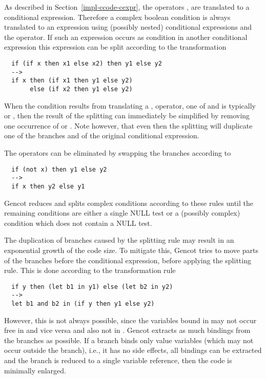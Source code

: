 As described in Section~\ref{impl-ccode-cexpr}, the operators \code{\&\&}, \code{||} are translated to a conditional expression. Therefore
a complex boolean condition is always translated to an expression using (possibly nested) conditional expressions and the  operator.
If such an expression occurs as condition in another conditional expression this expression can be split according to the transformation
\begin{verbatim}
  if (if x then x1 else x2) then y1 else y2
  -->
  if x then (if x1 then y1 else y2)
       else (if x2 then y1 else y2)
\end{verbatim}
When the condition results from translating a \code{\&\&}, \code{||} operator, one of  and  is typically 
or , then the result of the splitting can immediately be simplified by removing one occurrence of  or .
Note however, that even then the splitting will duplicate one of the branches  and  of the original conditional expression.

The  operators can be eliminated by swapping the branches according to
\begin{verbatim}
  if (not x) then y1 else y2
  -->
  if x then y2 else y1
\end{verbatim}

Gencot reduces and splits complex conditions according to these rules until the remaining conditions are either a single NULL test
or a (possibly complex) condition which does not contain a NULL test.

The duplication of branches caused by the splitting rule may result in an exponential growth of the code size. To mitigate this, Gencot
tries to move parts of the branches before the conditional expression, before applying the splitting rule. This is done according to the
transformation rule
\begin{verbatim}
  if y then (let b1 in y1) else (let b2 in y2)
  -->
  let b1 and b2 in (if y then y1 else y2)
\end{verbatim}
However, this is not always possible, since the variables bound in  may not occur free in  and vice versa and
also not in . Gencot extracts as much bindings from the branches as possible. If a branch binds only value variables (which may
not occur outside the branch), i.e., it has no side effects, all bindings can be extracted and the branch is reduced to a single variable
reference, then the code is minimally enlarged.


